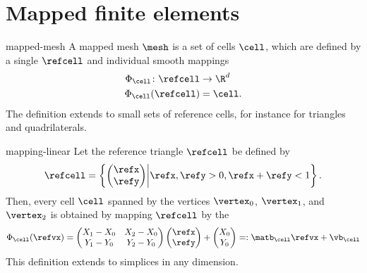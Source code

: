 \section{Mapped finite elements}

\begin{Definition}{mapped-mesh}
  A mapped mesh $\mesh$ is a set of cells $\cell$, which are defined
  by a single  $\refcell$ and individual
  smooth mappings
  \begin{gather}
    \begin{split}
      \Phi_\cell \colon \refcell &\to \R^d\\
      \Phi_\cell(\refcell) &= \cell.
    \end{split}
  \end{gather}
  The definition extends to small sets of reference cells, for
  instance for triangles and quadrilaterals.
\end{Definition}

\begin{Example}{mapping-linear}
  Let the reference triangle $\refcell$ be defined by
  \begin{gather}
    \refcell = \left\{
      \begin{pmatrix}
        \refx\\\refy
      \end{pmatrix}
      \middle|
      \refx,\refy >0, \refx+\refy < 1
    \right\}.
  \end{gather}
  Then, every cell $\cell$ spanned by the vertices $\vertex_0$,
  $\vertex_1$, and $\vertex_2$ is obtained by mapping $\refcell$ by
  the 
  \begin{gather}
    \Phi_\cell(\refvx) =
    \begin{pmatrix}
      X_1-X_0 & X_2 - X_0 \\ Y_1-Y_0 & Y_2 - Y_0
    \end{pmatrix}
    \begin{pmatrix}
      \refx \\ \refy
    \end{pmatrix}
    +
    \begin{pmatrix}
      X_0 \\ Y_0
    \end{pmatrix} =: \matb_\cell \refvx + \vb_\cell
  \end{gather}
  This definition extends to simplices in any dimension.
\end{Example}

